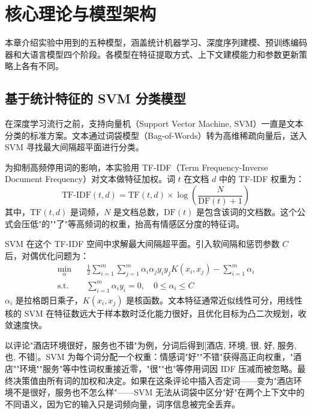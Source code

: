 \section{核心理论与模型架构}
\label{sec:theory}

本章介绍实验中用到的五种模型，涵盖统计机器学习、深度序列建模、预训练编码器和大语言模型四个阶段。各模型在特征提取方式、上下文建模能力和参数更新策略上各有不同。

\subsection{基于统计特征的 SVM 分类模型}
在深度学习流行之前，支持向量机（Support Vector Machine, SVM）一直是文本分类的标准方案。文本通过词袋模型（Bag-of-Words）转为高维稀疏向量后，送入 SVM 寻找最大间隔超平面进行分类。

为抑制高频停用词的影响，本实验用 TF-IDF（Term Frequency-Inverse Document Frequency）对文本做特征加权。词 $t$ 在文档 $d$ 中的 TF-IDF 权重为：
\begin{equation}
	\text{TF-IDF}(t, d) = \text{TF}(t, d) \times \log \left( \frac{N}{\text{DF}(t) + 1} \right)
\end{equation}
其中，$\text{TF}(t, d)$ 是词频，$N$ 是文档总数，$\text{DF}(t)$ 是包含该词的文档数。这个公式会压低"的""了"等高频词的权重，抬高有情感区分度的特征词。

SVM 在这个 TF-IDF 空间中求解最大间隔超平面。引入软间隔和惩罚参数 $C$ 后，对偶优化问题为：
\begin{equation}
	\begin{aligned}
		\min_{\alpha} \quad & \frac{1}{2} \sum_{i=1}^{m} \sum_{j=1}^{m} \alpha_i \alpha_j y_i y_j K(x_i, x_j) - \sum_{i=1}^{m} \alpha_i \\
		\text{s.t.} \quad & \sum_{i=1}^{m} \alpha_i y_i = 0, \quad 0 \leq \alpha_i \leq C
	\end{aligned}
\end{equation}
$\alpha_i$ 是拉格朗日乘子，$K(x_i, x_j)$ 是核函数。文本特征通常近似线性可分，用线性核的 SVM 在特征数远大于样本数时泛化能力很好，且优化目标为凸二次规划，收敛速度快。

以评论"酒店环境很好，服务也不错"为例，分词后得到[酒店, 环境, 很, 好, 服务, 也, 不错]。SVM 为每个词分配一个权重：情感词"好""不错"获得高正向权重，"酒店""环境""服务"等中性词权重接近零，"很""也"等停用词因 IDF 压减而被忽略。最终决策值由所有词的加权和决定。如果在这条评论中插入否定词——变为"酒店环境不是很好，服务也不怎么样"——SVM 无法从词袋中区分"好"在两个上下文中的不同语义，因为它的输入只是词频向量，词序信息被完全丢弃。

